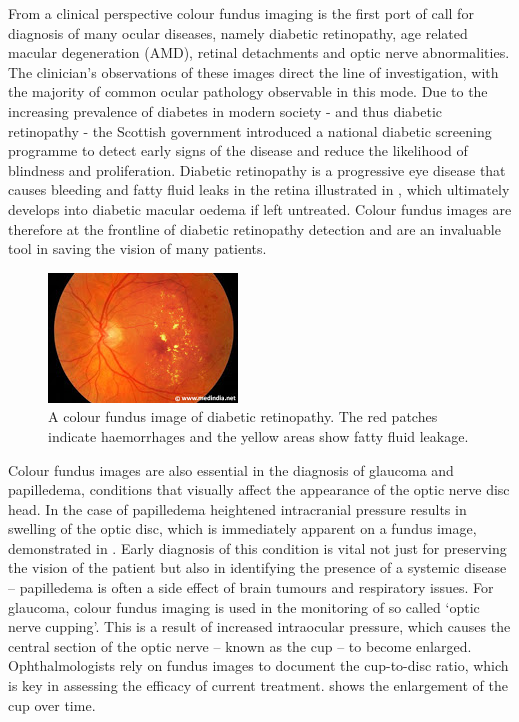 From a clinical perspective colour fundus imaging is the first port of call for diagnosis of many ocular diseases, namely diabetic retinopathy, age related macular degeneration (AMD), retinal detachments and optic nerve abnormalities. The clinician’s observations of these images direct the line of investigation, with the majority of common ocular pathology observable in this mode. Due to the increasing prevalence of diabetes in modern society - and thus diabetic retinopathy - the Scottish government introduced a national diabetic screening programme to detect early signs of the disease and reduce the likelihood of blindness and proliferation. Diabetic retinopathy is a progressive eye disease that causes bleeding and fatty fluid leaks in the retina illustrated in , which ultimately develops into diabetic macular oedema if left untreated. Colour fundus images are therefore at the frontline of diabetic retinopathy detection and are an invaluable tool in saving the vision of many patients. 

\begin{figure}[htbp]
\centering
  \includegraphics{figures/diabeticretinopathy}
\caption{A colour fundus image of diabetic retinopathy. The red patches indicate haemorrhages and the yellow areas show fatty fluid leakage.}
\label{fig:dr }
     \end{figure}

Colour fundus images are also essential in the diagnosis of glaucoma and papilledema, conditions that visually affect the appearance of the optic nerve disc head.  In the case of papilledema heightened intracranial pressure results in swelling of the optic disc, which is immediately apparent on a fundus image, demonstrated in . Early diagnosis of this condition is vital not just for preserving the vision of the patient but also in identifying the presence of a systemic disease – papilledema is often a side effect of brain tumours and respiratory issues. For glaucoma, colour fundus imaging is used in the monitoring of so called ‘optic nerve cupping’. This is a result of increased intraocular pressure, which causes the central section of the optic nerve – known as the cup – to become enlarged. Ophthalmologists rely on fundus images to document the cup-to-disc ratio, which is key in assessing the efficacy of current treatment.  shows the enlargement of the cup over time. 

